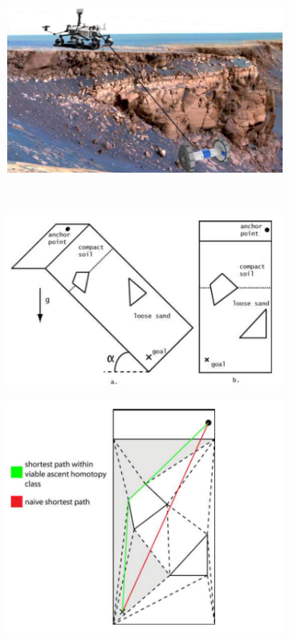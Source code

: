 \documentclass[12pt]{article}
\begin{document}
\begin{figure}
  \vspace{-0.4in}
  \begin{subfigure}{.45\textwidth}
    \centering
    \includegraphics[width=.95\linewidth]{axel_deploy}
    \caption{}
    \label{fig:axeldeploy}
  \end{subfigure}\\
  \begin{subfigure}{.25\textwidth}
    \centering
    \includegraphics[width=.99\linewidth]{planar_terrain}
    \caption{}
    \label{fig:planarterrain}
  \end{subfigure}%
  \begin{subfigure}{.2\textwidth}
    \centering
    \includegraphics[width=.95\linewidth]{planar_path}

\end{subfigure}
\end{figure}
\end{document}
